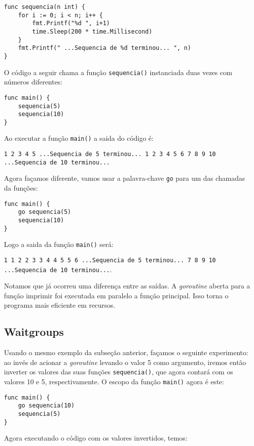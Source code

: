 \documentclass{SBCbookchapter}
\begin{document}
\begin{lstlisting}
func sequencia(n int) {
	for i := 0; i < n; i++ {
		fmt.Printf("%d ", i+1)
		time.Sleep(200 * time.Millisecond)
	}
	fmt.Printf(" ...Sequencia de %d terminou... ", n)
}
\end{lstlisting}

O código a seguir chama a função \texttt{sequencia()} instanciada duas vezes com números diferentes:

\begin{lstlisting}
func main() {
	sequencia(5)
	sequencia(10)
}
\end{lstlisting}

Ao executar a função \texttt{main()} a saida do código é:

\noindent\texttt{1 2 3 4 5  ...Sequencia de 5 terminou... 1 2 3 4 5 6 7 8 9 10  ...Sequencia de 10 terminou...}

Agora façamos diferente, vamos usar a palavra-chave \texttt{go} para um das chamadas da funções:

\begin{lstlisting}
func main() {
	go sequencia(5)
	sequencia(10)
}
\end{lstlisting}

Logo a saida da função \texttt{main()} será: 

\noindent\texttt{1 1 2 2 3 3 4 4 5 5 6  ...Sequencia de 5 terminou... 7 8 9 10  ...Sequencia de 10 terminou...}. 

Notamos que já ocorreu uma diferença entre as saídas. A \textit{goroutine} aberta para a função imprimir foi executada em paralelo a função principal. Isso torna o programa mais eficiente em recursos.

\subsection{Waitgroups}

Usando o mesmo exemplo da subseção anterior, façamos o seguinte experimento: ao invés de acionar a \textit{goroutine} levando o valor 5 como argumento, iremos então inverter os valores das suas funções \texttt{sequencia()}, que agora contará com os valores 10 e 5, respectivamente. O escopo da função \texttt{main()} agora é este: 

\begin{lstlisting}
func main() {
	go sequencia(10)
	sequencia(5)
}
\end{lstlisting}

Agora executando o código com os valores invertidos, temos: 
\end{document}
